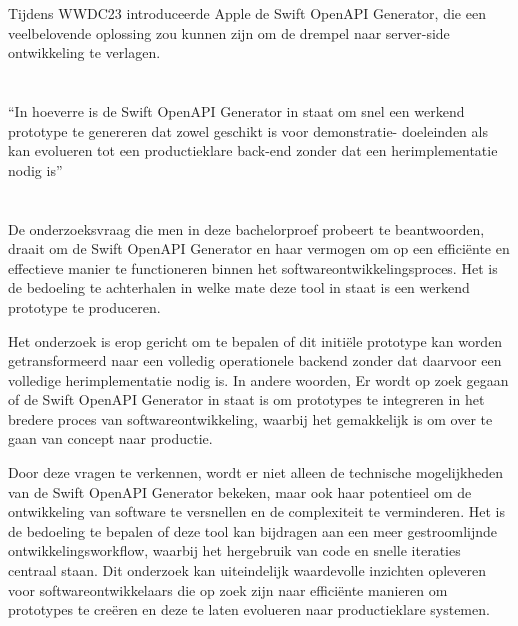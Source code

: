 Tijdens WWDC23 introduceerde Apple de Swift OpenAPI Generator, die een veelbelovende oplossing zou kunnen zijn om de drempel naar server-side ontwikkeling te verlagen.


\section{}%
\label{sec:onderzoeksvraag}

“In hoeverre is de Swift OpenAPI Generator in staat om snel een werkend prototype te genereren dat zowel geschikt is voor demonstratie- doeleinden als kan evolueren tot een productieklare back-end zonder dat een herimplementatie nodig is”

\section{}%
\label{sec:onderzoeksdoelstelling}

De onderzoeksvraag die men in deze bachelorproef probeert te beantwoorden, draait om de Swift OpenAPI Generator en haar vermogen om op een efficiënte en effectieve manier te functioneren binnen het softwareontwikkelingsproces. Het is de bedoeling te achterhalen in welke mate deze tool in staat is een werkend prototype te produceren. 

Het onderzoek is erop gericht om te bepalen of dit initiële prototype kan worden getransformeerd naar een volledig operationele backend zonder dat daarvoor een volledige herimplementatie nodig is. In andere woorden, Er wordt op zoek gegaan of de Swift OpenAPI Generator in staat is om prototypes te integreren in het bredere proces van softwareontwikkeling, waarbij het gemakkelijk is om over te gaan van concept naar productie.

Door deze vragen te verkennen, wordt er niet alleen de technische mogelijkheden  van de Swift OpenAPI Generator bekeken, maar ook haar potentieel om de ontwikkeling van software te versnellen en de complexiteit te verminderen. Het is de bedoeling te bepalen of deze tool kan bijdragen aan een meer gestroomlijnde ontwikkelingsworkflow, waarbij het hergebruik van code en snelle iteraties centraal staan. Dit onderzoek kan uiteindelijk waardevolle inzichten opleveren voor softwareontwikkelaars die op zoek zijn naar efficiënte manieren om prototypes te creëren en deze te laten evolueren naar productieklare systemen.


